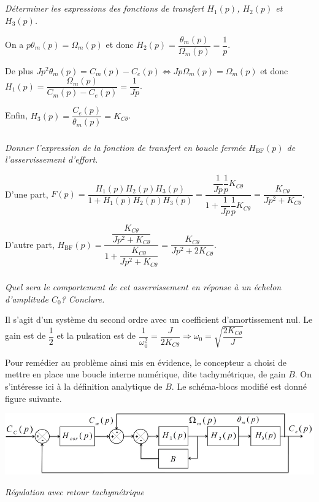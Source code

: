 \documentclass[10pt,fleqn]{article} %
\begin{document}
\subparagraph{}
\textit{Déterminer les expressions des fonctions de transfert $H_1(p)$, $H_2(p)$ et $H_3(p)$.}
\ifprof
\begin{corrige}
On a $p\theta_m(p)=\Omega_m(p)$ et donc $H_2(p)=\dfrac{\theta_m(p)}{\Omega_m(p)}=\dfrac{1}{p}$.

De plus $Jp^2 \theta_m(p) = C_m(p)-C_e(p) \Leftrightarrow Jp\Omega_m(p) = \Omega_m(p)$ et donc $H_1(p)=\dfrac{\Omega_m(p)}{C_m(p)-C_e(p)}=\dfrac{1}{Jp}$.

Enfin, $H_3(p)=\dfrac{C_e(p)}{\theta_m(p)}=K_{C\theta}$.

\end{corrige}
\else
\fi

\subparagraph{}
\textit{Donner l’expression de la fonction de transfert en boucle fermée $H_{\text{BF}}(p)$ de l’asservissement d’effort.}

\ifprof
\begin{corrige}
D'une part, $F(p)=\dfrac{H_1(p)H_2(p)H_3(p)}{1+H_1(p)H_2(p)H_3(p)} =\dfrac{\dfrac{1}{Jp}\dfrac{1}{p}K_{C\theta}}{1+\dfrac{1}{Jp}\dfrac{1}{p}K_{C\theta}} =\dfrac{K_{C\theta}}{Jp^2+K_{C\theta}}$.

D'autre part, $H_{\text{BF}}(p)
=\dfrac{\dfrac{K_{C\theta}}{Jp^2+K_{C\theta}}}{1+\dfrac{K_{C\theta}}{Jp^2+K_{C\theta}}}=\dfrac{K_{C\theta}}{Jp^2+2K_{C\theta}}
$.

\end{corrige}
\else
\fi

\subparagraph{}
\textit{Quel sera le comportement de cet asservissement en réponse à un échelon d'amplitude $C_0$?
Conclure.}
\ifprof
\begin{corrige}
Il s'agit d'un système du second ordre avec un coefficient d'amortissement nul. Le gain est de $\dfrac{1}{2}$ et la pulsation est de $\dfrac{1}{\omega_0^2}=\dfrac{J}{2K_{C\theta}} \Rightarrow \omega_0=\sqrt{\dfrac{2K_{C\theta}}{J}}$
\end{corrige}
\else
\fi

\vspace{.25cm}

Pour remédier au problème ainsi mis en évidence, le concepteur a choisi de mettre en place une boucle
interne numérique, dite tachymétrique, de gain $B$. On s’intéresse ici à la définition analytique de $B$.
Le schéma-blocs modifié est donné figure suivante.


\begin{center}
\includegraphics[width=.7\linewidth]{images/Sujet/images/fig_07}

\textit{Régulation avec retour tachymétrique}
\end{center}
\end{document}
